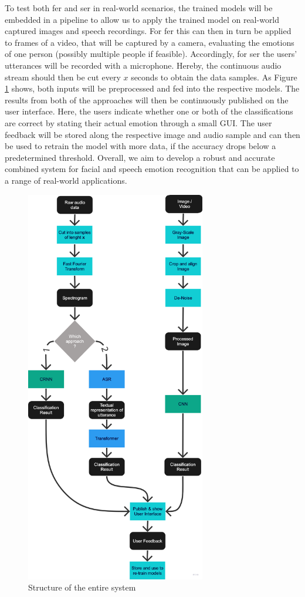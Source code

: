 To test both \acrshort{fer} and \acrshort{ser} in real-world scenarios, the trained models will be embedded in a pipeline to allow us to apply the trained model on real-world captured images and speech recordings. For \acrshort{fer} this can then in turn be applied to frames of a video, that will be captured by a camera, evaluating the emotions of one person (possibly multiple people if feasible). Accordingly, for \acrshort{ser} the users' utterances will be recorded with a microphone. Hereby, the continuous audio stream should then be cut every $x$ seconds to obtain the data samples. As Figure \ref{fig:whole-system} shows, both inputs will be preprocessed and fed into the respective models. The results from both of the approaches will then be continuously published on the user interface. Here, the users indicate whether one or both of the classifications are correct by stating their actual emotion through a small GUI. The user feedback will be stored along the respective image and audio sample and can then be used to retrain the model with more data, if the accuracy drops below a predetermined threshold. Overall, we aim to develop a robust and accurate combined system for facial and speech emotion recognition that can be applied to a range of real-world applications.

\begin{figure}[h]
\centering
\includegraphics[width=0.7\textwidth]{images/whole-system.png}
\caption{Structure of the entire system}\label{fig:whole-system}
\end{figure}